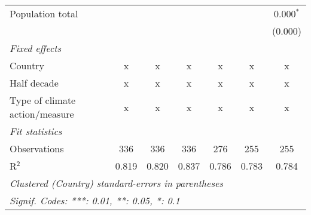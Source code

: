 \begin{tabular}{lcccccc}
   Population total                                                &         &         &                &                &                & 0.000$^{*}$\\   
                                                                   &         &         &                &                &                & (0.000)\\   
   \emph{Fixed effects}\\
   Country                                                         & x       & x       & x              & x              & x              & x\\  
   Half decade                                                     & x       & x       & x              & x              & x              & x\\  
   Type of climate action/measure                                  & x       & x       & x              & x              & x              & x\\  
   \midrule \emph{Fit statistics}\\
   Observations                                                    & 336     & 336     & 336            & 276            & 255            & 255\\  
   R$^2$                                                           & 0.819   & 0.820   & 0.837          & 0.786          & 0.783          & 0.784\\  
   \midrule
   \multicolumn{7}{l}{\emph{Clustered (Country) standard-errors in parentheses}}\\
   \multicolumn{7}{l}{\emph{Signif. Codes: ***: 0.01, **: 0.05, *: 0.1}}\\
\end{tabular}
\par\endgroup


